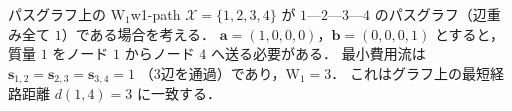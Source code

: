 \begin{example}{パスグラフ上の $\mathrm{W}_1$}{w1-path}
$\mathcal{X} = \{1, 2, 3, 4\}$ が
$1$---$2$---$3$---$4$ のパスグラフ（辺重み全て $1$）である場合を考える．
$\mathbf{a} = (1, 0, 0, 0)$，$\mathbf{b} = (0, 0, 0, 1)$ とすると，
質量 $1$ をノード $1$ からノード $4$ へ送る必要がある．
最小費用流は $\mathbf{s}_{1,2} = \mathbf{s}_{2,3} = \mathbf{s}_{3,4} = 1$
（3辺を通過）であり，$\mathrm{W}_1 = 3$．
これはグラフ上の最短経路距離 $d(1, 4) = 3$ に一致する．
\end{example}
